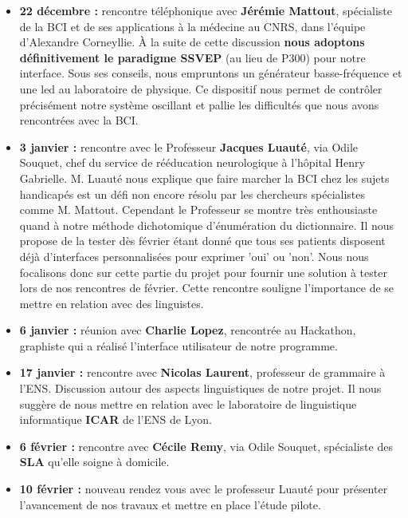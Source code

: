 \documentclass[11pt,a4paper]{article}
\theoremstyle{plain}
\theoremstyle{definition}
\begin{document}
\begin{itemize}
        \item \textbf{22 décembre : } rencontre téléphonique avec \textbf{Jérémie Mattout}, spécialiste de la BCI et de ses applications à la médecine au CNRS, dans l'équipe d'Alexandre Corneyllie. À la suite de cette discussion \textbf{nous adoptons définitivement le paradigme SSVEP} (au lieu de P300) pour notre interface. Sous ses conseils, nous empruntons un générateur basse-fréquence et une led au laboratoire de physique. Ce dispositif nous permet de contrôler précisément notre système oscillant et pallie les difficultés que nous avons rencontrées avec la BCI. \\
        \item \textbf{3 janvier : } rencontre avec le Professeur \textbf{Jacques Luauté}, via Odile Souquet, chef du service de rééducation neurologique à l'hôpital Henry Gabrielle. M. Luauté nous explique que faire marcher la BCI chez les sujets handicapés est un défi non encore résolu par les chercheurs spécialistes comme M. Mattout. Cependant le Professeur se montre très enthousiaste quand à notre méthode dichotomique d'énumération du dictionnaire. Il nous propose de la tester dès février étant donné que tous ses patients disposent déjà d'interfaces personnalisées pour exprimer 'oui' ou 'non'. Nous nous focalisons donc sur cette partie du projet pour fournir une solution à tester lors de nos rencontres de février. Cette rencontre souligne l'importance de se mettre en relation avec des linguistes. \\
        \item \textbf{6 janvier : } réunion avec \textbf{Charlie Lopez}, rencontrée au Hackathon, graphiste qui a réalisé l'interface utilisateur de notre programme. \\
        \item \textbf{17 janvier : } rencontre avec \textbf{Nicolas Laurent}, professeur de grammaire à l'ENS. Discussion autour des aspects linguistiques de notre projet. Il nous suggère de nous mettre en relation avec le laboratoire de linguistique informatique \textbf{ICAR} de l'ENS de Lyon. \\
        \item \textbf{6 février : } rencontre avec \textbf{Cécile Remy}, via Odile Souquet, spécialiste des \textbf{SLA} qu'elle soigne à domicile. \\
        \item \textbf{10 février : } nouveau rendez vous avec le professeur Luauté pour présenter l'avancement de nos travaux et mettre en place l'étude pilote. \\

\end{itemize}
\end{document}
